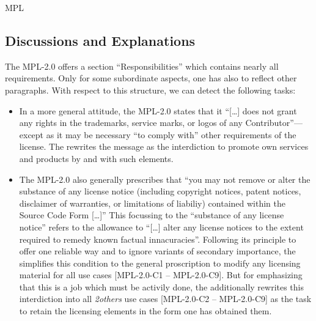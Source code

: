 \begin{license}{MPL}

\subsection{Discussions and Explanations}
\label{MPLDiscussion}
The MPL-2.0 offers a section \enquote{Responsibilities} which contains nearly all
requirements. Only for some subordinate aspects, one has also to
reflect other paragraphs.
With respect to this structure, we can detect the following tasks:

\begin{itemize}

\item In a more general attitude, the MPL-2.0 states that it \enquote{[\ldots]
  does not grant any rights in the trademarks, service marks, or logos of any
  Contributor}---except as it may be necessary \enquote{to comply with} other
  requirements of the license. The \oslic{} rewrites the message
  as the interdiction to promote own services and products by and with such
  elements. 
  
\item The MPL-2.0 also generally prescribes that \enquote{you may not remove or
  alter the substance of any license notice (including copyright notices, patent
  notices, disclaimer of warranties, or limitations of liabiliy) contained
  within the Source Code Form [\ldots]} This focussing to the
  \enquote{substance of any license notice} refers to the allowance to
  \enquote{[\ldots] alter any license notices to the extent required to remedy
  known factual innacuracies}.  Following its principle to offer
  one reliable way and to ignore variants of secondary importance, the \oslic{}
  simplifies this condition to the general proscription to modify any licensing
  material for all use cases [MPL-2.0-C1 -- MPL-2.0-C9]. But for emphasizing
  that this is a job which must be activily done, the \oslic{} additionally
  rewrites this interdiction into all \emph{2others} use cases [MPL-2.0-C2 --
  MPL-2.0-C9] as the task to retain the licensing elements in the form one has
  obtained them. 
  

\end{itemize}
\end{license}
